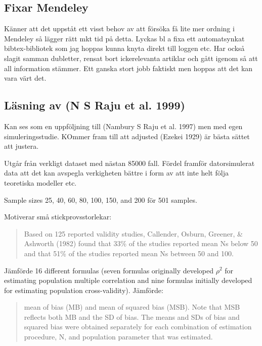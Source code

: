 \documentclass[]{article}
\begin{document}
\subsection{Fixar Mendeley}\label{fixar-mendeley}

Känner att det uppståt ett visst behov av att försöka få lite mer
ordning i Mendeley så lägger rätt mkt tid på detta. Lyckas bl a fixa ett
automatsynkat bibtex-bibliotek som jag hoppas kunna knyta direkt till
loggen etc. Har också slagit samman dubletter, rensat bort ickerelevanta
artiklar och gått igenom så att all information stämmer. Ett ganska
stort jobb faktiskt men hoppas att det kan vara värt det.

\subsection{Läsning av (N S Raju et al.
1999)}\label{lasning-av-raju1999}

Kan ses som en uppföljning till (Nambury S Raju et al. 1997) men med
egen simuleringsstudie. KOmmer fram till att adjusted (Ezekei 1929) är
bästa sättet att justera.

Utgår från verkligt dataset med nästan 85000 fall. Fördel framför
datorsimulerat data att det kan avspegla verkigheten bättre i form av
att inte helt följa teoretiska modeller etc.

Sample sizes 25, 40, 60, 80, 100, 150, and 200 för 501 samples.

Motiverar små stickprovsstorlekar:

\begin{quote}
Based on 125 reported validity studies, Callender, Osburn, Greener, \&
Ashworth (1982) found that 33\% of the studies reported mean Ns below 50
and that 51\% of the studies reported mean Ns between 50 and 100.
\end{quote}

Jämförde 16 different formulas (seven formulas originally developed
\(\rho^2\) for estimating population multiple correlation and nine
formulas initially developed for estimating population cross-validity).
Jämförde:

\begin{quote}
mean of bias (MB) and mean of squared bias (MSB). Note that MSB reflects
both MB and the SD of bias. The means and SDs of bias and squared bias
were obtained separately for each combination of estimation procedure,
N, and population parameter that was estimated.
\end{quote}
\end{document}

